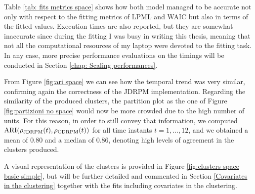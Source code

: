 \documentclass[12pt,	%
	a4paper,		%
	twoside,		%
	openright,		%
	titlepage,%
	]{book}
\theoremstyle{definition}
\begin{document}
Table \ref{tab: fits metrics space} shows how both model managed to be accurate not only with respect to the fitting metrics of LPML and WAIC but also in terms of the fitted values. Execution times are also reported, but they are somewhat inaccurate since during the fitting I was busy in writing this thesis, meaning that not all the computational resources of my laptop were devoted to the fitting task. In any case, more precise performance evaluations on the timings will be conducted in Section \ref{chap: Scaling performances}.

From Figure \ref{fig:ari space} we can see how the temporal trend was very similar, confirming again the correctness of the JDRPM implementation. Regarding the similarity of the produced clusters, the partition plot as the one of Figure \ref{fig:partizioni no space} would now be more crowded due to the high number of units. For this reason, in order to still convey that information, we computed $\operatorname{ARI}(\rho_{\text{JDRPM}}(t),\rho_{\text{CDRPM}}(t))$ for all time instants $t=1,\ldots,12$, and we obtained a mean of 0.80 and a median of 0.86, denoting high levels of agreement in the clusters produced.

A visual representation of the clusters is provided in Figure \ref{fig:clusters space basic simple}, but will be further detailed and commented in Section \ref{Covariates in the clustering} together with the fits including covariates in the clustering.
\end{document}
